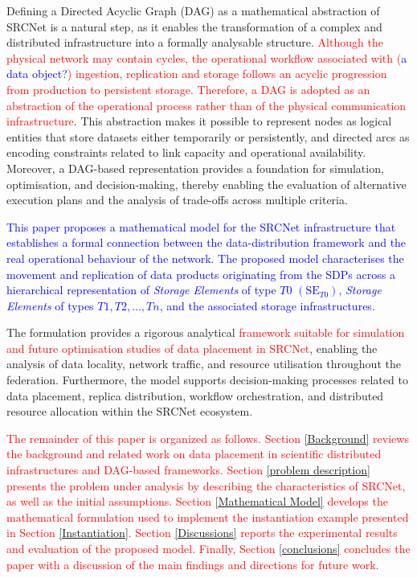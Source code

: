 \documentclass[a4paper,fleqn]{cas-dc}
\begin{document}
Defining a Directed Acyclic Graph (DAG) as a mathematical abstraction of SRCNet is a natural step, as it enables the transformation of a complex and distributed infrastructure into a formally analysable structure. \textcolor{red}{Although the physical network may contain cycles, the operational workflow associated with (\textcolor{blue}{a data object?}) ingestion, replication and storage follows an acyclic progression from production to persistent storage. Therefore, a DAG is adopted as an abstraction of the operational process rather than of the physical communication infrastructure}. This abstraction makes it possible to represent nodes as logical entities that store datasets either temporarily or persistently, and directed arcs as encoding constraints related to link capacity and operational availability. Moreover, a DAG-based representation provides a foundation for simulation, optimisation, and decision-making, thereby enabling the evaluation of alternative execution plans and the analysis of trade-offs across multiple criteria.


\textcolor{blue}{This paper proposes a mathematical model for the SRCNet infrastructure that establishes a formal connection between the data-distribution framework and the real operational behaviour of the network. The proposed model characterises the movement and replication of data products originating from the SDPs across a hierarchical representation of \emph{Storage Elements} of type \(T0\) \((\mathrm{SE}_{T0})\), \emph{Storage Elements} of types \(T1, T2, \dots, Tn\), and the associated storage infrastructures.}

The formulation provides a rigorous analytical \textcolor{red}{framework suitable for simulation and future optimisation studies of data placement in SRCNet}, enabling the analysis of data locality, network traffic, and resource utilisation throughout the federation. Furthermore, the model supports decision-making processes related to data placement, replica distribution, workflow orchestration, and distributed resource allocation within the SRCNet ecosystem. 

\textcolor{red}{The remainder of this paper is organized as follows. Section \ref{Background} reviews the background and related work on data placement in scientific distributed infrastructures and DAG-based frameworks. Section \ref{problem description} presents the problem under analysis by describing the characteristics of SRCNet, as well as the initial assumptions. Section \ref{Mathematical Model} develops the mathematical formulation used to implement the instantiation example presented in Section \ref{Instantiation}. Section \ref{Discussions} reports the experimental results and evaluation of the proposed model. Finally, Section \ref{conclusions} concludes the paper with a discussion of the main findings and directions for future work.}
\end{document}
